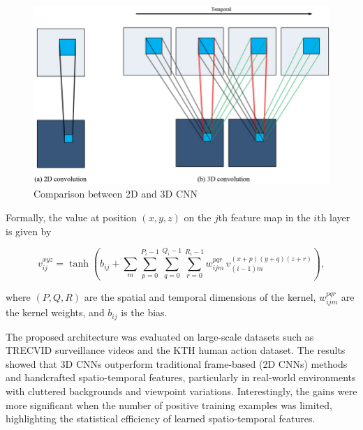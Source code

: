 \begin{figure} [H]
    \centering
    \includegraphics[width=0.7\linewidth]{Images//Chapters/Comparison-between-2D-CNN-and-3D-CNN.png}
    \caption{Comparison between 2D and 3D CNN}
    \label{fig:2Dvs3DCNN}
\end{figure}

Formally, the value at position $(x, y, z)$ on the $j$th feature map in the $i$th layer is given by

\begin{equation}
v^{xyz}_{ij} = \tanh \left( b_{ij} + 
\sum_{m} \sum_{p=0}^{P_i-1} \sum_{q=0}^{Q_i-1} \sum_{r=0}^{R_i-1} 
w^{pqr}_{ijm} \, v_{(i-1)m}^{(x+p)(y+q)(z+r)} \right),
\end{equation}

where $(P,Q,R)$ are the spatial and temporal dimensions of the kernel, $w^{pqr}_{ijm}$ are the kernel weights, and $b_{ij}$ is the bias.  

The proposed architecture was evaluated on large-scale datasets such as TRECVID surveillance videos and the KTH human action dataset. The results showed that 3D CNNs outperform traditional frame-based (2D CNNs) methods and handcrafted spatio-temporal features, particularly in real-world environments with cluttered backgrounds and viewpoint variations. Interestingly, the gains were more significant when the number of positive training examples was limited, highlighting the statistical efficiency of learned spatio-temporal features.

\clearpage